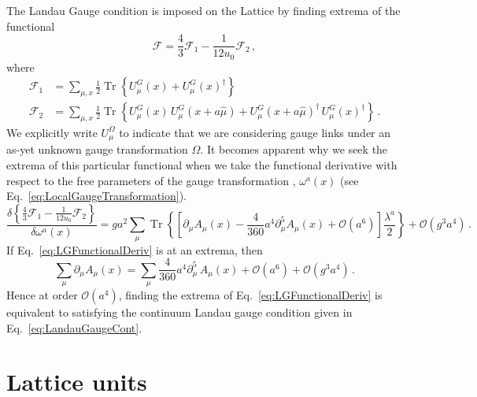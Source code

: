 The Landau Gauge condition is imposed on the Lattice by finding extrema of the functional~\cite{Bonnet:1999mj}
%
\begin{equation}
\mathcal{F} =  \frac{4}{3}\mathcal{F}_1 - \frac{1}{12u_0}\mathcal{F}_2\, ,
\label{eq:LGFunctional}
\end{equation}
%
where
%
\begin{align*}
\mathcal{F}_1 &= \sum _ { \mu , x } \frac { 1 } { 2 } \operatorname { Tr } \left\{ U _ { \mu } ^ { G } ( x ) + U _ { \mu } ^ { G } ( x ) ^ { \dagger } \right\}\\
\mathcal{F}_2 &= \sum _ { \mu , x } \frac { 1 } { 2 } \operatorname { Tr } \left\{ U _ { \mu } ^ { G } ( x ) \,U _ { \mu } ^ { G } ( x + a\hat { \mu } ) + U _ { \mu } ^ { G } ( x + a\hat { \mu } )^\dagger\, U _ { \mu } ^ { G } ( x )^\dagger  \right\}\, .
\end{align*}
%
We explicitly write $U^\Omega_\mu$ to indicate that we are considering gauge links under an as-yet unknown gauge transformation $\Omega$. It becomes apparent why we seek the extrema of this particular functional when we take the functional derivative with respect to the free parameters of the gauge transformation , $\omega^a(x)$ (see Eq.~\ref{eq:LocalGaugeTransformation}).
%
\begin{equation}
\frac { \delta \left\{ \frac { 4 } { 3 } \mathcal { F } _ { 1 } - \frac { 1 } { 12 u _ { 0 } } \mathcal { F } _ { 2 } \right\} } { \delta \omega ^ { a } ( x ) } = g a ^ { 2 } \sum _ { \mu } \operatorname { Tr } \left\{ \left[ \partial _ { \mu } A _ { \mu } ( x ) - \frac { 4 } { 360 } a ^ { 4 } \partial _ { \mu } ^ { 5 } A _ { \mu } ( x ) + \mathcal { O } \left( a ^ { 6 } \right) \right] \frac{\lambda^a}{2} \right\} + \mathcal { O } \left( g ^ { 3 } a ^ { 4 } \right)\, .
\label{eq:LGFunctionalDeriv}
\end{equation}
%
If Eq.~\ref{eq:LGFunctionalDeriv} is at an extrema, then 
%
\begin{equation*}
\sum_\mu \partial_\mu A_\mu(x) = \sum_\mu \frac{4}{360}a^4 \partial_\mu^5\,A_\mu(x) + \mathcal{O}(a^6)+\mathcal{O}(g^3a^4)\, .
\end{equation*}
%
Hence at order $\mathcal{O}(a^4)$, finding the extrema of Eq.~\ref{eq:LGFunctionalDeriv} is equivalent to satisfying the continuum Landau gauge condition given in Eq.~\ref{eq:LandauGaugeCont}.

\section{Lattice units}

